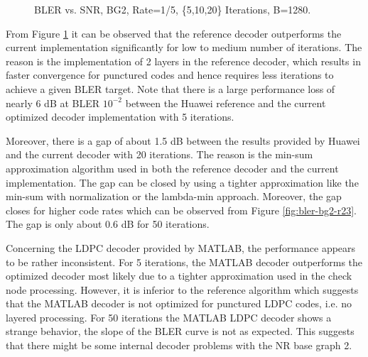 \documentclass{article}
\def\SNR{\mathsf{SNR}}
\begin{document}
\begin{figure}[ht]
  \caption{BLER vs. SNR, BG2, Rate=1/5, \{5,10,20\} Iterations, B=1280.}
  \label{fig:bler-bg2-15}
\end{figure}

From Figure \ref{fig:bler-bg2-15} it can be observed that the reference decoder outperforms the current implementation significantly for low to medium number of iterations. The reason is the implementation of 2 layers in the reference decoder, which results in faster convergence for punctured codes and hence requires less iterations to achieve a given BLER target. Note that there is a large performance loss of nearly 6 dB at BLER $10^{-2}$ between the Huawei reference and the current optimized decoder implementation with 5 iterations.

Moreover, there is a gap of about 1.5 dB between the results provided by Huawei and the current decoder with 20 iterations. The reason is the min-sum approximation algorithm used in both the reference decoder and the current implementation. The gap can be closed by using a tighter approximation like the min-sum with normalization or the lambda-min approach. Moreover, the gap closes for higher code rates which can be observed from Figure \ref{fig:bler-bg2-r23}. The gap is only about 0.6 dB for 50 iterations.

Concerning the LDPC decoder provided by MATLAB, the performance appears to be rather inconsistent. For 5 iterations, the MATLAB decoder outperforms the optimized decoder most likely due to a tighter approximation used in the check node processing. However, it is inferior to the reference algorithm which suggests that the MATLAB decoder is not optimized for punctured LDPC codes, i.e. no layered processing. For 50 iterations the MATLAB LDPC decoder shows a strange behavior, the slope of the BLER curve is not as expected. This suggests that there might be some internal decoder problems with the NR base graph 2.
\end{document}
